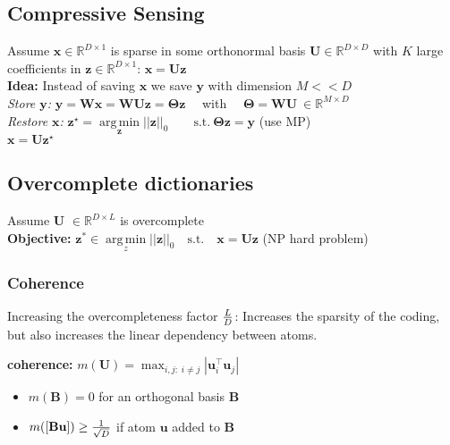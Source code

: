 \documentclass[a4paper,11pt]{article}
\newcommand{\argmin}{\operatorname*{arg\,min}}
\newcommand{\R}{\mathbb{R}}
\begin{document}
\begin{multicols}{2}
\subsection{Compressive Sensing}
Assume $\mathbf{x} \in \R^{D \times 1}$ is sparse in some orthonormal basis $\textbf{U} \in \R^{D \times D}$ with $K$ large coefficients in $\mathbf{z} \in \R^{D \times 1}$: $\mathbf x = \mathbf{U} \mathbf z$\\
\textbf{Idea:} Instead of saving $\mathbf{x}$ we save $\mathbf{y}$ with dimension $M << D$\\
\emph{Store $\mathbf{y}$:} \hspace{0.61cm}$ \mathbf y = \mathbf W \mathbf x = \mathbf W \mathbf U \mathbf z = \mathbf \Theta \mathbf z \quad$ with $\quad \mathbf \Theta = \mathbf W \mathbf U \ \in \R^{M\times D}$\\

\emph{Restore $\mathbf x$:} \hspace{0.03cm}
$\mathbf{z}^\star = \argmin \limits_{\mathbf{z}} ||\mathbf{z}||_0 \qquad \text{s.t.}\ \mathbf \Theta \mathbf z = \mathbf y$ \hspace{0.5cm}(use MP)\\
\hspace{1.8cm} $\mathbf{x} = \mathbf{U} \mathbf{z}^\star$

\subsection{Overcomplete dictionaries}
Assume \textbf{U} $\in \R^{D \times L}$ is overcomplete\\
\textbf{Objective:} 
$\mathbf{z}^* \in \argmin \limits_z ||\mathbf z||_0 \quad \text{s.t.}\quad \mathbf x = \mathbf U \mathbf z$ \hspace{0.3cm}(NP hard problem)

\subsubsection{Coherence}
Increasing the overcompleteness factor ${L \over D}$: Increases the sparsity of the coding, but also increases the linear dependency between atoms.

\vspace{0.1cm}
\textbf{coherence:} 
$m(\mathbf U) = \max_{i, j: \; i \neq j} | \mathbf u_i^\top \mathbf u_j |$
\begin{itemize}[leftmargin=0.5cm]
  \itemsep0em 
  \item $m(\mathbf B) = 0$ for an orthogonal basis $\mathbf B$
  \item $m([\mathbf B \mathbf u]) \geq {1 \over \sqrt{D}}$ if atom $\mathbf u$ added to $\mathbf B$
\end{itemize}


\end{multicols}
\end{document}
